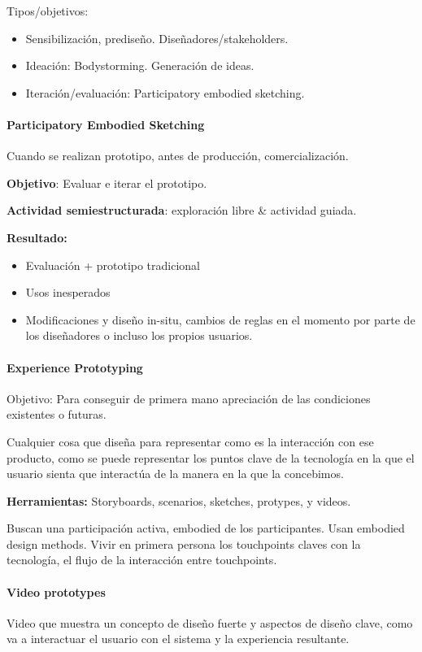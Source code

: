 \documentclass[12pt, twoside, openright]{report} %
\begin{document}
Tipos/objetivos:
\begin{itemize}
	\item Sensibilización, prediseño. Diseñadores/stakeholders.
	\item Ideación: Bodystorming. Generación de ideas.
	\item Iteración/evaluación: Participatory embodied sketching.
\end{itemize}

\paragraph{Participatory Embodied Sketching}
Cuando se realizan prototipo, antes de producción, comercialización.

\textbf{Objetivo}: Evaluar e iterar el prototipo.

\textbf{Actividad semiestructurada}: exploración libre \& actividad guiada.

\textbf{Resultado:}
\begin{itemize}
	\item Evaluación + prototipo tradicional
	\item Usos inesperados
	\item Modificaciones y diseño in-situ, cambios de reglas en el momento por parte de los diseñadores o incluso los propios usuarios.
\end{itemize}

\paragraph{Experience Prototyping}
Objetivo: Para conseguir de primera mano apreciación de las condiciones existentes o futuras.

Cualquier cosa que diseña para representar como es la interacción con ese producto, como se puede representar los puntos clave de la tecnología en la que el usuario sienta que interactúa de la manera en la que la concebimos.

\textbf{Herramientas:} Storyboards, scenarios, sketches, protypes, y videos.

Buscan una participación activa, embodied de los participantes. Usan embodied design methods. Vivir en primera persona los touchpoints claves con la tecnología, el flujo de la interacción entre touchpoints.

\paragraph{Video prototypes}
Video que muestra un concepto de diseño fuerte y aspectos de diseño clave, como va a interactuar el usuario con el sistema y la experiencia resultante.
\end{document}
